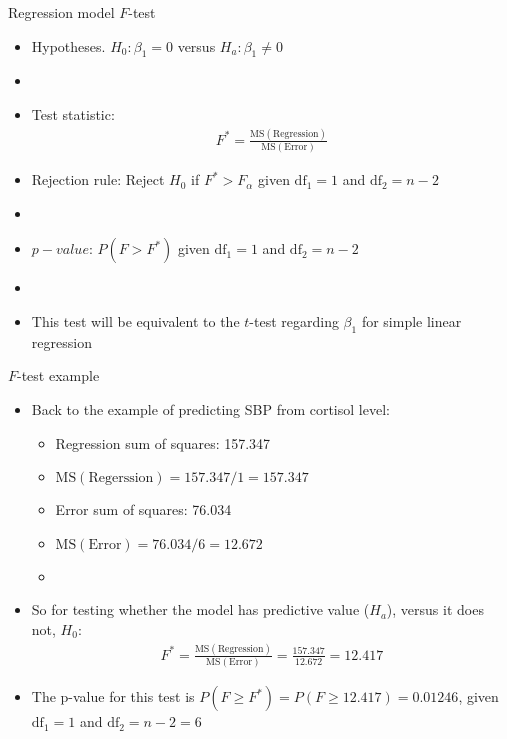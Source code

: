 \documentclass[xcolor=dvipsnames]{beamer}
\begin{document}
\begin{frame}{Regression model $F$-test}
	\begin{itemize}
		\item Hypotheses. $H_0: \beta_1 = 0$ versus $H_a: \beta_1 \neq 0$
		\item[]
		\item Test statistic:
		\begin{gather*}
		F^*= \frac{\text{MS}(\text{Regression})}{\text{MS}(\text{Error})}
		\end{gather*}
		\item Rejection rule: Reject $H_0$ if $F^*> F_{\alpha}$ given $\text{df}_1=1$ and $\text{df}_2=n-2$
		\item[]
		\item $p-value$: $P(F > F^*)$ given $\text{df}_1=1$ and $\text{df}_2=n-2$
		\item[]
		\item This test will be equivalent to the $t$-test regarding $\beta_1$ for simple linear regression
	\end{itemize}
\end{frame}

\begin{frame}{$F$-test example}
	\begin{itemize}
		\item Back to the example of predicting SBP from cortisol level:
		\begin{itemize}
			\item Regression sum of squares: 157.347
			\item $\text{MS}(\text{Regerssion}) = 157.347 / 1 = 157.347$
			\item Error sum of squares: 76.034
			\item $\text{MS}(\text{Error}) = 76.034 / 6 = 12.672$
			\item[]
		\end{itemize}
		\item So for testing whether the model has predictive value ($H_a$), versus it does not, $H_0$:
		\begin{gather*}
			F^*= \frac{\text{MS}(\text{Regression})}{\text{MS}(\text{Error})} = \frac{157.347}{12.672} = 12.417
		\end{gather*}
		\item The p-value for this test is $P(F \geq F^*) = P(F \geq 12.417) = 0.01246$,  given $\text{df}_1=1$ and $\text{df}_2=n-2 = 6$
	\end{itemize}
\end{frame}
\end{document}
